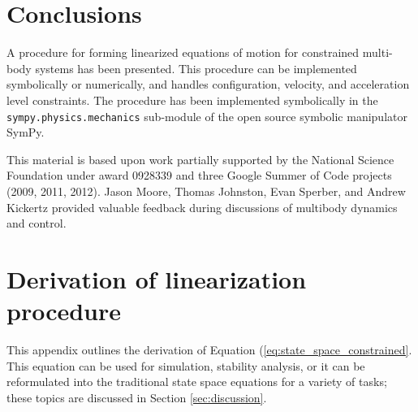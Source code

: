 \documentclass[smallcondensed]{svjour3}                     %
\begin{document}
\section{Conclusions}
A procedure for forming linearized equations of motion for constrained
multi-body systems has been presented.  This procedure can be implemented
symbolically or numerically, and handles configuration, velocity, and
acceleration level constraints.  The procedure has been implemented
symbolically in the \texttt{sympy.physics.mechanics} sub-module of the open
source symbolic manipulator SymPy\cite{SymPy2012}.

\begin{acknowledgements}
 This material is based upon work partially supported by the National Science
 Foundation under award 0928339 and three Google Summer of Code projects (2009,
 2011, 2012).  Jason Moore, Thomas Johnston, Evan Sperber, and Andrew Kickertz
 provided valuable feedback during discussions of multibody dynamics and
 control.
\end{acknowledgements}

\appendix
\section{Derivation of linearization procedure}
\label{sec:derivations}

This appendix outlines the derivation of Equation
(\ref{eq:state_space_constrained}. This equation can be used for simulation,
stability analysis, or it can be reformulated into the traditional state space
equations for a variety of tasks; these topics are discussed in Section
\ref{sec:discussion}.
\end{document}

